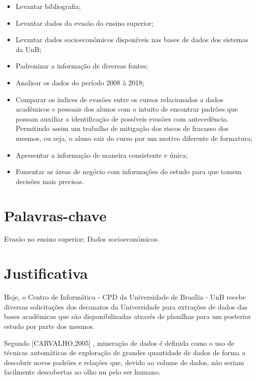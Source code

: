 \begin{enumerate} 
    \begin{itemize}
        \item   Levantar bibliografia;
        \item   Levantar dados da evasão do ensino superior;
        \item   Levantar dados socioeconômicos disponíveis nas bases de dados dos sistemas da UnB;
        \item	Padronizar a informação de diversas fontes;
        \item	Analisar os dados do período 2008 à 2018;
        \item   Comparar os índices de evasões entre os cursos relacionados a dados acadêmicos e pessoais dos alunos com o intuito  de encontrar padrões que possam auxiliar a identificação de possíveis evasões com antecedência. Permitindo assim um trabalho de mitigação dos riscos de fracasso dos mesmos, ou seja, o aluno sair do curso por um motivo diferente de formatura;
        \item	Apresentar a informação de maneira consistente e única;
        \item	Fomentar as áreas de negócio com informações do estudo para que tomem decisões mais precisas.
        
    \end{itemize}%
\end{enumerate}%

\section{Palavras-chave}%
Evasão no ensino superior; Dados socioeconômicos.


\section{Justificativa}%
Hoje, o Centro de Informática - CPD da Universidade de Brasília - UnB recebe diversas solicitações dos decanatos da Universidade para  extrações de dados das bases acadêmicas que são disponibilizadas através de planilhas para um posterior estudo por parte dos mesmos.

Segundo [CARVALHO,2005]%
, mineração de dados é definida  como o uso de técnicas automáticas de exploração de grandes quantidade de dados de forma a descobrir novos padrões e relações que, devido ao volume de dados, não seriam facilmente descobertas ao olho nu pelo ser humano.

